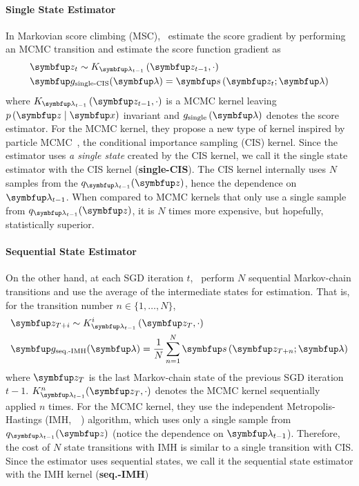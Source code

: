 \vspace{-0.05in}
\paragraph{Single State Estimator}
In Markovian score climbing (MSC),~\citet{NEURIPS2020_b2070693} estimate the score gradient by performing an MCMC transition and estimate the score function gradient as
\vspace{-0.05in}
\begin{align*}
  &\vz_t \sim K_{\vlambda_{t-1}}\left(\vz_{t-1}, \cdot \right) \\
  &\vg_{\text{single-CIS}}(\vlambda) = \vs\,(\vz_t; \vlambda)
\end{align*}
where \(K_{\vlambda_{t-1}}\left(\vz_{t-1}, \cdot\right)\) is a MCMC kernel leaving \(p\,(\vz\mid\vx)\) invariant and \(g_{\text{single}}\left(\vlambda\right)\) denotes the score estimator.
For the MCMC kernel, they propose a new type of kernel inspired by particle MCMC~\citep{andrieu_particle_2010, andrieu_uniform_2018}, the conditional importance sampling (CIS) kernel.
Since the estimator uses \textit{a single state} created by the CIS kernel, we call it the single state estimator with the CIS kernel (\textbf{single-CIS}).
The CIS kernel internally uses \(N\) samples from the \(q_{\vlambda_{t-1}}(\vz)\), hence the dependence on \(\vlambda_{t-1}\).
When compared to MCMC kernels that only use a single sample from \(q_{\vlambda_{t-1}}(\vz)\), it is \(N\) times more expensive, but hopefully, statistically superior.

\vspace{-0.08in}
\paragraph{Sequential State Estimator}
On the other hand, at each SGD iteration \(t\),~\citet{pmlr-v124-ou20a} perform \(N\) sequential Markov-chain transitions and use the average of the intermediate states for estimation.
That is, for the transition number \(n \in \{1, \ldots, N\}\),
\vspace{-0.05in}
\begin{align*}
  &\vz_{T+i} \sim K_{\vlambda_{t-1}}^i\left(\vz_{T}, \cdot \right) \\
  &\vg_{\text{seq.-IMH}}(\vlambda) = \frac{1}{N} \sum_{n=1}^N \vs\,(\vz_{T+n}; \vlambda)
\end{align*}
where \(\vz_T\) is the last Markov-chain state of the previous SGD iteration 
\(t-1\).
\(K^{n}_{\vlambda_{t-1}}(\vz_{T}, \cdot)\) denotes the MCMC kernel sequentially applied \(n\) times.
For the MCMC kernel, they use the independent Metropolis-Hastings (IMH,~\citealt[Algorithm 25]{robert_monte_2004}~\citealt{hastings_monte_1970}) algorithm, which uses only a single sample from \(q_{\vlambda_{t-1}}(\vz)\) (notice the dependence on \(\vlambda_{t-1}\)).
Therefore, the cost of \(N\) state transitions with IMH is similar to a single transition with CIS.
Since the estimator uses sequential states, we call it the sequential state estimator with the IMH kernel (\textbf{seq.-IMH})


